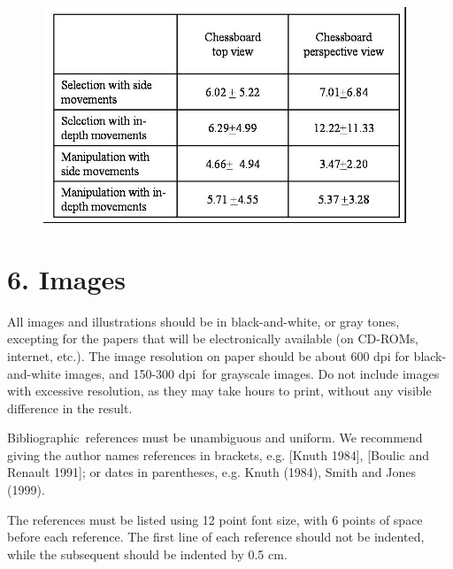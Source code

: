 \documentclass[12pt]{article}
\begin{document}

\begin{figure}[H]
	\begin{Center}
		\includegraphics[width=309pt,height=183pt]{./media/image3.jpeg}
	\end{Center}
\end{figure}




\vspace{\baselineskip}
\section*{6. Images}
All images and illustrations should be in black-and-white, or gray tones, excepting for the papers that will be electronically available (on CD-ROMs, internet, etc.). The image resolution on paper should be about 600 dpi for black-and-white images, and 150-300 dpi\ for grayscale images.  Do not include images with excessive resolution, as they may take hours to print, without any visible difference in the result.\par

\par

Bibliographic\ references must be unambiguous and uniform.  We recommend giving the author names references in brackets, e.g. [Knuth 1984], [Boulic and Renault 1991]; or dates in parentheses, e.g. Knuth (1984), Smith and Jones (1999).\par

\tab The references must be listed using 12 point font size, with 6 points of space before each reference. The first line of each reference should not be indented, while the subsequent should be indented by 0.5 cm.\par
\end{document}
